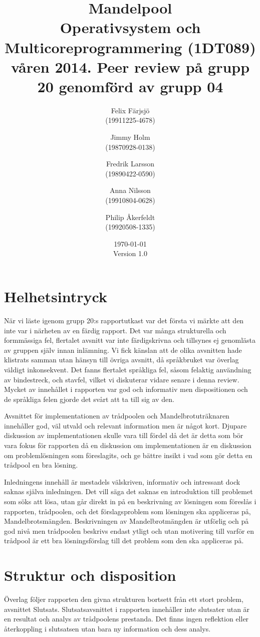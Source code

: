 \documentclass[a4paper]{article}
\title{Mandelpool\\\small{Operativsystem och Multicoreprogrammering (1DT089) våren 2014. Peer review på grupp 20 genomförd av grupp 04}}
\author{Felix Färjsjö\\(19911225-4678) \and Jimmy Holm\\(19870928-0138) \and Fredrik Larsson\\(19890422-0590) \and Anna Nilsson\\(19910804-0628) \and Philip Åkerfeldt\\(19920508-1335)}
\date{\today\\Version 1.0}
\begin{document}
\maketitle
\newpage

\section{Helhetsintryck}
När vi läste igenom grupp 20:s rapportutkast var det första vi märkte att den inte var i närheten av en färdig rapport. Det var många strukturella och formmässiga fel, flertalet avsnitt var
inte färdigskrivna och tillsynes ej genomlästa av gruppen själv innan inlämning. Vi fick känslan att de olika avsnitten hade klistrats samman utan hänsyn till övriga avsnitt, då språkbruket
var överlag väldigt inkonsekvent. Det fanns flertalet språkliga fel, såsom felaktig användning av bindestreck, och stavfel, vilket vi diskuterar vidare senare i denna review. Mycket av
innehållet i rapporten var god och informativ men dispositionen och de språkliga felen gjorde det svårt att ta till sig av den.

Avsnittet för implementationen av trådpoolen och Mandelbrotuträknaren innehåller god, väl utvald och relevant information men är något kort. Djupare diskussion av implementationen skulle vara
till fördel då det är detta som bör vara fokus för rapporten då en diskussion om implementationen är en diskussion om problemlösningen som föreslagits, och ge bättre insikt i vad som gör detta
en trådpool en bra lösning.

Inledningens innehåll är mestadels välskriven, informativ och intressant dock saknas själva inledningen. Det vill säga det saknas en introduktion till problemet som söks att lösa, utan går
direkt in på en beskrivning av lösningen som föreslås i rapporten, trådpoolen, och det förslagsproblem som lösningen ska appliceras på, Mandelbrotsmängden. Beskrivningen av Mandelbrotmängden
är utförlig och på god nivå men trådpoolen beskrivs endast ytligt och utan motivering till varför en trådpool är ett bra lösningsförslag till det problem som den ska appliceras på.


\section{Struktur och disposition}
Överlag följer rapporten den givna strukturen bortsett från ett stort problem, avsnittet Slutsats. Slutsatsavsnittet i rapporten innehåller inte slutsater utan är en resultat och analys
av trådpoolens prestanda. Det finns ingen reflektion eller återkoppling i slutsatsen utan bara ny information och dess analys.
\end{document}
